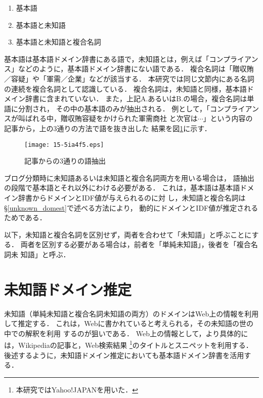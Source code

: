 \documentclass[japanese]{jnlp_1.4}
\begin{document}
\begin{enumerate}
\renewcommand{\labelenumi}{}
 \item 基本語 
 \item 基本語と未知語 
 \item 基本語と未知語と複合名詞
\end{enumerate}

基本語は基本語ドメイン辞書にある語で，未知語とは，例えば「コンプライアン
ス」などのように，基本語ドメイン辞書にない語である．
複合名詞は「贈収賄／容疑」や「軍需／企業」などが該当する．
本研究では同じ文節内にある名詞の連続を複合名詞として認識している．
複合名詞は，未知語と同様，基本語ドメイン辞書に含まれていない．
また，上記A.あるいはB.の場合，複合名詞は単語に分割され，
その中の基本語のみが抽出される．
例として，「コンプライアンスが叫ばれる中，贈収賄容疑をかけられた軍需商社
と次官は$\cdots$」という内容の記事から，上の3通りの方法で語を抜き出した
結果を図\ref{words-ext}に示す．


\begin{figure}[t]
\begin{center}
\texttt{[image: 15-5ia4f5.eps]}
\end{center}
\caption{記事からの3通りの語抽出}
\label{words-ext}
\end{figure}

ブログ分類時に未知語あるいは未知語と複合名詞両方を用いる場合は，
語抽出の段階で基本語とそれ以外にわける必要がある．
これは，基本語は基本語ドメイン辞書からドメインとIDF値が与えられるのに対
し，未知語と複合名詞は\S\ref{unknown_domest}で述べる方法により，
動的にドメインとIDF値が推定されるためである．

以下，未知語と複合名詞を区別せず，両者を合わせて「未知語」と呼ぶことにす
る．
両者を区別する必要がある場合は，前者を「単純未知語」，後者を「複合名詞未
知語」と呼ぶ．



\section{未知語ドメイン推定 \label{unknown_domest}}

未知語（単純未知語と複合名詞未知語の両方）のドメインはWeb上の情報を利用
して推定する．
これは，Webに書かれていると考えられる，その未知語の世の中での解釈を利用
するのが狙いである．
Web上の情報として，より具体的には，Wikipediaの記事と，Web検索結果
\footnote{本研究ではYahoo!JAPANを用いた．}のタイトルとスニペットを利用する．
後述するように，未知語ドメイン推定においても基本語ドメイン辞書を活用する．
\end{document}

